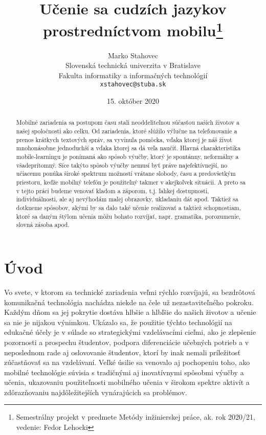 \documentclass[10pt,oneside,slovak,a4paper]{article}
\title{Učenie sa cudzích jazykov prostredníctvom mobilu\thanks{Semestrálny projekt v predmete Metódy inžinierskej práce, ak. rok 2020/21, vedenie: Fedor Lehocki}} %
\author{Marko Stahovec\\[2pt]
	{\small Slovenská technická univerzita v Bratislave}\\
	{\small Fakulta informatiky a informačných technológií}\\
	{\small \texttt{xstahovec@stuba.sk}}
	}
\date{\small 15. október 2020}
\begin{document}
\maketitle

\begin{abstract}
Mobilné zariadenia sa postupom času stali neoddeliteľnou súčasťou našich životov a našej spoločnosti ako celku. Od zariadenia, ktoré slúžilo výlučne na telefonovanie a prenos krátkych textových správ, sa vyvinula pomôcka, vďaka ktorej je náš život mnohonásobne jednoduchší a vďaka ktorej sa dá veľa naučiť. Hlavná charakteristika mobile-learningu je ponímaná ako spôsob výučby, ktorý je spontánny, neformálny a všadeprítomný. Síce takýto spôsob výučby nemusí byť práve najefektívnejší, no učiacemu ponúka široké spektrum možností vrátane slobody, času a predovšetkým priestoru, keďže mobilný telefón je použiteľný takmer v akejkoľvek situácii. A preto sa v tejto práci budeme venovať kladom a záporom, t.j. ľahkej dostupnosti, individuálnosti, ale aj nevýhodám malej obrazovky, ukladaniu dát apod. Taktiež sa dotkneme spôsobov, akými by sa dalo také učenie realizovať a taktiež schopnostiam, ktoré sa daným štýlom učenia môžu bohato rozvíjať, napr. gramatika, porozumenie, slovná zásoba apod.
\end{abstract}



\section{Úvod}


Vo svete, v ktorom sa technické zariadenia veľmi rýchlo rozvíjajú, sa bezdrôtová komunikačná technológia nachádza niekde na čele už nezastaviteľného pokroku\cite{Miangah2012}. Každým dňom sa jej pokrytie dostáva hlbšie a hlbľšie do našich životov a učenie sa nie je nijakou výnimkou. Ukázalo sa, že použitie týchto technológií na edukačné účely je v súlade so strategickými vzdelávacími cieľmi, ako je zlepšenie pozornosti a prospechu študentov, podpora diferenciácie učebných potrieb a v neposlednom rade aj oslovovanie študentov, ktorí by inak nemali príležitosť zúčastňovať sa na vzdelávaní\cite{KukulskaHulme2009}. Veľké úsilie sa venovalo aj pochopeniu toho, ako mobilné technológie súvisia s tradičnými aj inovatívnymi spôsobmi výučby a učenia, ukazovaniu použiteľnosti mobilného učenia v širokom spektre aktivít a zdôrazňovaniu najdôležitejších vynárajúcich sa problémov\cite{KukulskaHulme2009}. 
\end{document}
